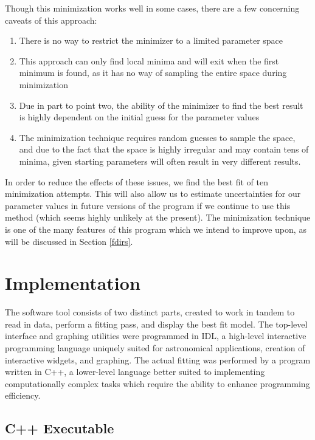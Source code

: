 \documentclass[twocolumn,letterpaper,10pt]{article}
\begin{document}
Though this minimization works well in some cases, there are a few concerning caveats of this approach:
\begin{enumerate}  \itemsep0pt \parskip0pt 
\item There is no way to restrict the minimizer to a limited parameter space
\item This approach can only find local minima and will exit when the first minimum is found, as it has no way of sampling the entire space during minimization
\item Due in part to point two, the ability of the minimizer to find the best result is highly dependent on the initial guess for the parameter values
\item The minimization technique requires random guesses to sample the space, and due to the fact that the space is highly irregular and may contain tens of minima, given starting parameters will often result in very different results.
\end{enumerate}
In order to reduce the effects of these issues, we find the best fit of ten minimization attempts. This will also allow us to estimate uncertainties for our parameter values in future versions of the program if we continue to use this method (which seems highly unlikely at the present). The minimization technique is one of the many features of this program which we intend to improve upon, as will be discussed in Section \ref{fdirs}.

\section{Implementation}

The software tool consists of two distinct parts, created to work in tandem to read in data, perform a fitting pass, and display the best fit model. The top-level interface and graphing utilities were programmed in IDL, a high-level interactive programming language uniquely suited for astronomical applications, creation of interactive widgets, and graphing. The actual fitting was performed by a program written in C++, a lower-level language better suited to implementing computationally complex tasks which require the ability to enhance programming efficiency.

\subsection{C++ Executable}
\end{document}
